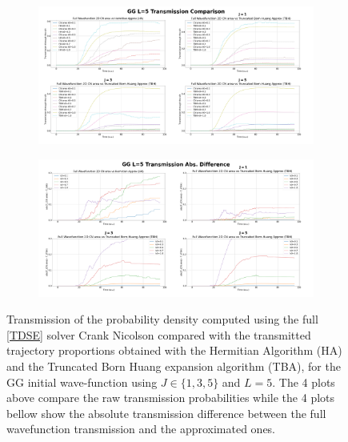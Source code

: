\documentclass[11pt, a4paper]{article} %
\begin{document}
\begin{figure}[p]
  \centering
  \begin{subfigure}[b]{1.1\linewidth}
    \includegraphics[width=\linewidth]{Example_Results/GG_L_5_transmission.png}
  \end{subfigure}
  \begin{subfigure}[b]{1.1\linewidth}
    \includegraphics[width=\linewidth]{Example_Results/GG_L_5_errors.png}
  \end{subfigure}

  
  \caption{ Transmission of the probability density computed using the full \ref{TDSE} solver Crank Nicolson compared with the transmitted trajectory proportions obtained with the Hermitian Algorithm (HA) and the Truncated Born Huang expansion algorithm (TBA), for the GG initial wave-function using $J\in\{1,3,5\}$ and $L=5$. The 4 plots above compare the raw transmission probabilities while the 4 plots bellow show the absolute transmission difference between the full wavefunction transmission and the approximated ones.}
  \label{fig:transm_GG_L5}
\end{figure}


\end{document}
